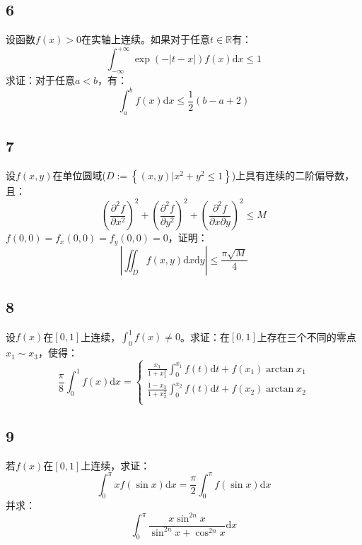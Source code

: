 \documentclass[a4paper,12pt]{article}
\begin{document}
\subsection*{6}\noindent 设函数$f(x)>0$在实轴上连续。如果对于任意$t\in\mathbb{R}$有：
\begin{equation*}
	\int_{-\infty}^{+\infty}\exp\left(-|t-x|\right)f\left(x\right)\mathrm{d}x\leq1
\end{equation*}
求证：对于任意$a<b$，有：
\begin{equation*}
	\int_{a}^{b}f\left(x\right)\mathrm{d}x\leq\frac{1}{2}\left(b-a+2\right)
\end{equation*}
\subsection*{7}\noindent 设$f\left(x,y\right)$在单位圆域($D:=\left\{\left(x,y\right)|x^2+y^2\leq 1\right\}$)上具有连续的二阶偏导数，且：
\begin{equation*}
\left(\frac{\partial^2 f}{\partial x^2}\right)^{2}+\left(\frac{\partial^2 f}{\partial y^2}\right)^{2}+\left(\frac{\partial^2 f}{\partial x\partial y}\right)^{2}\leq M
\end{equation*}
$f\left(0,0\right)=f_{x}\left(0,0\right)=f_{y}\left(0,0\right)=0$，证明：
\begin{equation*}
	\left|\iint_{D}f\left(x,y\right)\mathrm{d}x\mathrm{d}y\right|\leq\frac{\pi\sqrt{M}}{4}
\end{equation*}
\subsection*{8}\noindent 设$f\left(x\right)$在$\left[0,1\right]$上连续，$\int_{0}^{1}f\left(x\right)\neq 0$。求证：在$\left[0,1\right]$上存在三个不同的零点$x_{1}\sim x_{3}$，使得：
\begin{equation*}
	\frac{\pi}{8}\int_{0}^{1}f\left(x\right)\mathrm{d}x=\left\{
		\begin{aligned}
		\frac{x_{3}}{1+x_{1}^2}\int_{0}^{x_{1}}f\left(t\right)\mathrm{d}t+f\left(x_{1}\right)\arctan x_{1}\\
		\frac{1-x_{3}}{1+x_{2}^2}\int_{0}^{x_{2}}f\left(t\right)\mathrm{d}t+f\left(x_{2}\right)\arctan x_{2}\\	
	\end{aligned}
	\right.
\end{equation*}
\subsection*{9}\noindent 若$f\left(x\right)$在$\left[0,1\right]$上连续，求证：
\begin{equation*}
	\int_{0}^{\pi}xf\left(\sin x\right)\mathrm{d}x=\frac{\pi}{2}\int_{0}^{\pi}f\left(\sin x\right)\mathrm{d}x
\end{equation*}
并求：
\begin{equation*}
	\int_{0}^{\pi}\frac{x\sin^{2n}x}{\sin^{2n}x+\cos^{2n}x}\mathrm{d}x
\end{equation*}
\end{document}
